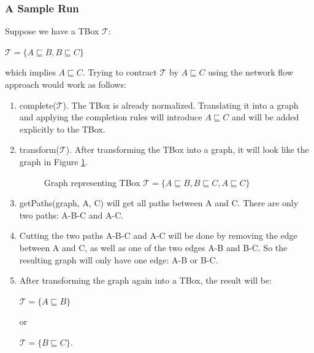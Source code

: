 \subsubsection{A Sample Run}
Suppose we have a TBox $\mathcal{T}$:
\begin{center}
$\mathcal{T} = \lbrace A \sqsubseteq B, B \sqsubseteq C \rbrace$
\end{center}
which implies $A \sqsubseteq C$. Trying to contract $\mathcal{T}$ by $A \sqsubseteq C$ using the network flow approach would work as follows:
\begin{enumerate}
\item complete($\mathcal{T}$). 
The TBox is already normalized. Translating it into a graph and applying the completion rules will introduce $A \sqsubseteq C$ and will be added explicitly to the TBox.
\item transform($\mathcal{T}$).
After transforming the TBox into a graph, it will look like the graph in Figure \ref{fig:abc-kb}.

\begin{figure}
\centering
{}
\caption{Graph representing TBox $\mathcal{T} = \lbrace A \sqsubseteq B, B \sqsubseteq C, A \sqsubseteq C \rbrace $}
\label{fig:abc-kb}
\end{figure}

\item getPaths(graph, A, C) will get all paths between A and C. There are only two paths: A-B-C and A-C. 

\item Cutting the two paths A-B-C and A-C will be done by removing the edge between A and C, as well as one of the two edges A-B and B-C. So the resulting graph will only have one edge: A-B or B-C.

\item After transforming the graph again into a TBox, the result will be:
\begin{center}
$\mathcal{T} = \lbrace A \sqsubseteq B \rbrace$
\end{center}
or 
\begin{center}
$\mathcal{T} = \lbrace B \sqsubseteq C \rbrace$.
\end{center}

\end{enumerate}


